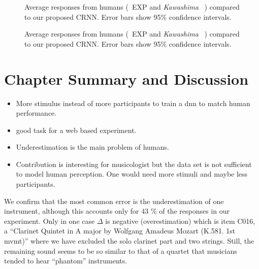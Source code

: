 \begin{figure}[t!]
    \centering
    \begin{adjustbox}{width=0.7\columnwidth}
      
    \end{adjustbox}
    \caption{Average responses from humans (\
    {EXP} and \emph{Kawashima}
~\cite{kawashima15}) compared to our proposed CRNN. Error bars show 95\% confidence intervals.}%
    \label{fig:experiment}
 \end{figure}

\begin{figure}[t!]
   \centering
   \begin{adjustbox}{width=0.7\columnwidth}
     
   \end{adjustbox}
   \caption{Average responses from humans (\
   {EXP} and \emph{Kawashima}
~\cite{kawashima15}) compared to our proposed CRNN. Error bars show 95\% confidence intervals.}%
   \label{fig:experiment}
\end{figure}

 \section{Chapter Summary and Discussion}

\begin{itemize}
  \item More stimulus instead of more participants to train a dnn to match human performance.
  \item good task for a web based experiment.
  \item Underestimation is the main problem of humans.
  \item Contribution is interesting for musicologist but the data set is not sufficient to model human perception. One would need more stimuli and maybe less participants. 
\end{itemize}

We confirm \cite{huron89} that the most common error is the underestimation of one instrument, although this accounts only for 43 \% of the responses in our experiment. Only in one case $\Delta$ is negative (overestimation) which is item C016, a ``Clarinet Quintet in A major by Wolfgang Amadeus Mozart (K.581. 1st mvmt)'' where we have excluded the solo clarinet part and two strings. Still, the remaining sound seems to be so similar to that of a quartet that musicians tended to hear ``phantom'' instruments.
\vspace{-1.0em}
